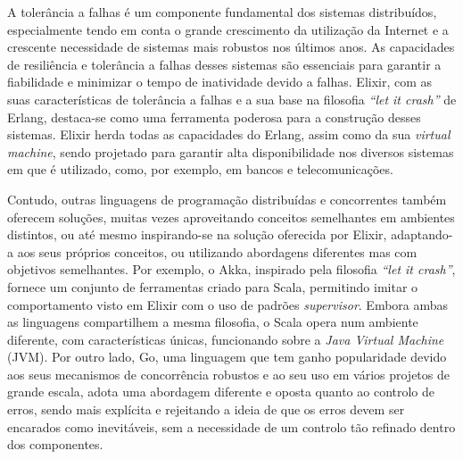 \begin{abstractotherlanguage}


A tolerância a falhas é um componente fundamental dos sistemas distribuídos, especialmente tendo em conta o grande crescimento da utilização da Internet e a crescente necessidade de sistemas mais robustos nos últimos anos. As capacidades de resiliência e tolerância a falhas desses sistemas são essenciais para garantir a fiabilidade e minimizar o tempo de inatividade devido a falhas. Elixir, com as suas características de tolerância a falhas e a sua base na filosofia \textit{“let it crash”} de Erlang, destaca-se como uma ferramenta poderosa para a construção desses sistemas. Elixir herda todas as capacidades do Erlang, assim como da sua \textit{virtual machine}, sendo projetado para garantir alta disponibilidade nos diversos sistemas em que é utilizado, como, por exemplo, em bancos e telecomunicações.

Contudo, outras linguagens de programação distribuídas e concorrentes também oferecem soluções, muitas vezes aproveitando conceitos semelhantes em ambientes distintos, ou até mesmo inspirando-se na solução oferecida por Elixir, adaptando-a aos seus próprios conceitos, ou utilizando abordagens diferentes mas com objetivos semelhantes. Por exemplo, o Akka, inspirado pela filosofia \textit{“let it crash”}, fornece um conjunto de ferramentas criado para Scala, permitindo imitar o comportamento visto em Elixir com o uso de padrões \textit{supervisor}. Embora ambas as linguagens compartilhem a mesma filosofia, o Scala opera num ambiente diferente, com características únicas, funcionando sobre a \textit{Java Virtual Machine} (JVM). Por outro lado, Go, uma linguagem que tem ganho popularidade devido aos seus mecanismos de concorrência robustos e ao seu uso em vários projetos de grande escala, adota uma abordagem diferente e oposta quanto ao controlo de erros, sendo mais explícita e rejeitando a ideia de que os erros devem ser encarados como inevitáveis, sem a necessidade de um controlo tão refinado dentro dos componentes.


\end{abstractotherlanguage}
